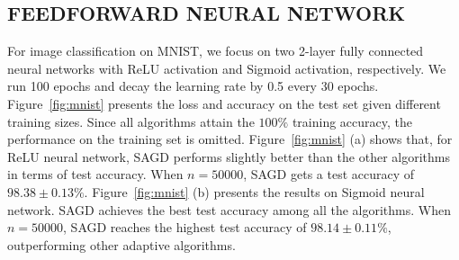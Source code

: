 \documentclass[11pt]{article}
\begin{document}
\subsection{FEEDFORWARD NEURAL NETWORK} \label{subsec: fnn}
For image classification on MNIST, we focus on two 2-layer fully connected neural networks with ReLU activation and Sigmoid activation, respectively. We run 100 epochs and decay the learning rate by 0.5 every 30 epochs. 
Figure~\ref{fig:mnist} presents the loss and accuracy on the test set given different training sizes. Since all algorithms attain the $100\%$ training accuracy, the performance on the training set is omitted. 
Figure~\ref{fig:mnist} (a) shows that, for ReLU neural network, 
SAGD performs slightly better than the other algorithms in terms of test accuracy. When $n =50000$, SAGD gets a test accuracy of $98.38 \pm 0.13 \%$. 
Figure~\ref{fig:mnist} (b) presents the results on Sigmoid neural network. SAGD achieves the best test accuracy among all the algorithms. When $n =50000$, SAGD reaches the highest test accuracy of $98.14 \pm 0.11 \%$, outperforming other adaptive algorithms.




\vspace{-0.05in}
\end{document}
